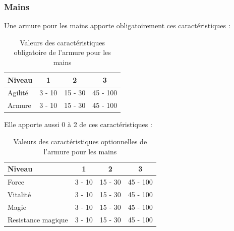 \documentclass[11pt, a4paper, oneside]{report}
\begin{document}
\subsubsection{Mains}
Une armure pour les mains apporte obligatoirement ces caractéristiques :
\begin{table}[H]
\begin{center}
\begin{tabular}{| l | c | c | c |}
  \hline      
  Niveau 				& 1 & 2 & 3\\ \hline \hline
  Agilité 				& 3 - 10 & 15 - 30 & 45 - 100\\ \hline
  Armure 				& 3 - 10 & 15 - 30 & 45 - 100\\ \hline
\end{tabular}
\caption{Valeurs des caractéristiques obligatoire de l'armure pour les mains}
\end{center}
\end{table}
Elle apporte aussi 0 à 2 de ces caractéristiques :
\begin{table}[H]
\begin{center}
\begin{tabular}{| l | c | c | c |}
  \hline      
  Niveau 				& 1 & 2 & 3\\ \hline \hline                 
  Force 				& 3 - 10 & 15 - 30 & 45 - 100\\ \hline
  Vitalité 				& 3 - 10 & 15 - 30 & 45 - 100\\ \hline
  Magie 				& 3 - 10 & 15 - 30 & 45 - 100\\ \hline
  Resistance magique 	& 3 - 10 & 15 - 30 & 45 - 100\\ \hline
\end{tabular}
\caption{Valeurs des caractéristiques optionnelles de l'armure pour les mains}
\end{center}
\end{table}
\end{document}
